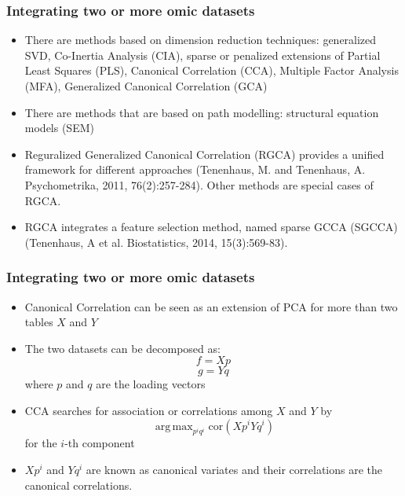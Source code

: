 \documentclass[10pt,xcolor=dvipsnames]{beamer}\usepackage[]{graphicx}\usepackage[]{color}
\DeclareMathOperator{\argmax}{arg\,max}
\begin{document}
\begin{frame}\frametitle{Integrating two or more omic datasets}

\begin{itemize}
\item There are methods based on dimension reduction techniques: generalized SVD, Co-Inertia Analysis (CIA), sparse or penalized extensions of Partial Least Squares (PLS),
Canonical Correlation (CCA), Multiple Factor Analysis (MFA), Generalized Canonical Correlation (GCA)
\pause
\item There are methods that are based on path modelling: structural equation models (SEM)
\pause
\item Reguralized Generalized Canonical Correlation (RGCA) provides a unified framework for different approaches (Tenenhaus, M. and Tenenhaus, A. Psychometrika, 2011, 76(2):257-284). Other methods are special cases of RGCA.
\pause
\item RGCA integrates a feature selection method, named sparse GCCA (SGCCA) (Tenenhaus, A et al. Biostatistics, 2014, 15(3):569-83).
\end{itemize}

\end{frame}




\begin{frame}\frametitle{Integrating two or more omic datasets}

\begin{itemize}
\item Canonical Correlation can be seen as an extension of PCA for more than two tables $X$ and $Y$
\item The two datasets can be decomposed as:
$$ f =Xp $$ $$ g =Yq $$
where $p$ and $q$ are the loading vectors
\item CCA searches for association or correlations among $X$ and $Y$ by
$$ \argmax_{p^i q^i} \text{cor}(Xp^i Yq^i)$$
for the $i$-th component
\item $Xp^i$ and $Yq^i$ are known as canonical variates and their correlations are the canonical correlations.
\end{itemize}

\end{frame}
\end{document}
